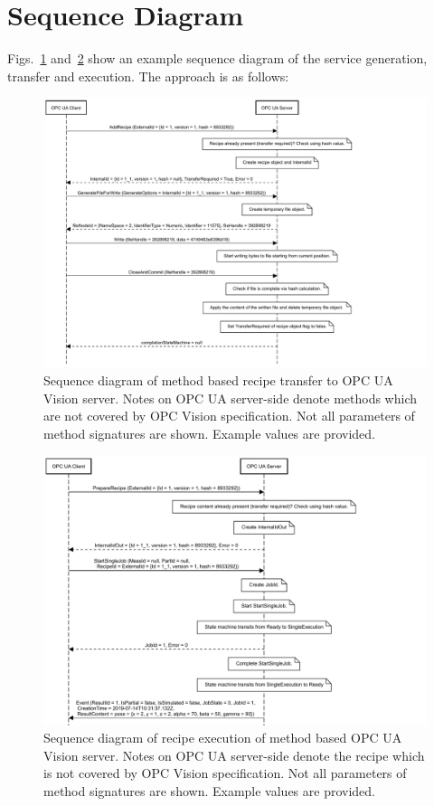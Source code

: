 \section{Sequence Diagram}
Figs.~\ref{fig:runtimeviewgen} and~\ref{fig:runtimeviewexec} show an example sequence diagram of the service generation, transfer and execution. The approach is as follows:
\begin{figure}
    \centering
    \includegraphics[width=1.2\textwidth]{img/OPCUAVisionAddRecipe.pdf}
    \caption[Sequence diagram of method based recipe transfer]{Sequence diagram of method based recipe transfer to OPC UA Vision server. Notes on OPC UA server-side denote methods which are not covered by OPC Vision specification. Not all parameters of method signatures are shown. Example values are provided.}
    \label{fig:runtimeviewgen}
\end{figure}

\begin{figure}
    \centering
    \includegraphics[width=1.2\textwidth]{img/OPCUAVisionPrepareRecipe.pdf}
    \caption[Sequence diagram of recipe execution]{Sequence diagram of recipe execution of method based OPC UA Vision server. Notes on OPC UA server-side denote the recipe which is not covered by OPC Vision specification. Not all parameters of method signatures are shown. Example values are provided.}
    \label{fig:runtimeviewexec}
\end{figure}

